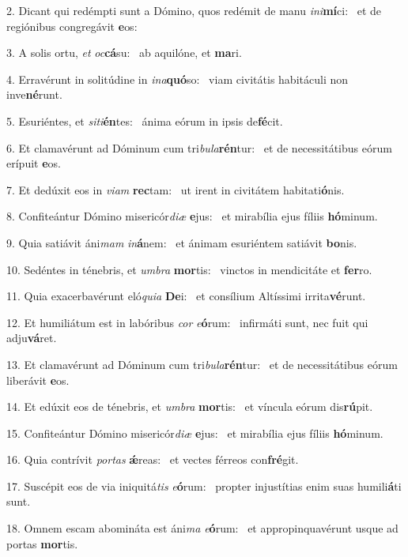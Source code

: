 2. Dicant qui redémpti sunt a Dómino, quos redémit de manu \textit{in}\textit{i}\textbf{mí}ci: \ast\  et de regiónibus congregávit \textbf{e}os:\

3. A solis ortu, \textit{et} \textit{oc}\textbf{cá}su: \ast\  ab aquilóne, et \textbf{ma}ri.\

4. Erravérunt in solitúdine in \textit{in}\textit{a}\textbf{quó}so: \ast\  viam civitátis habitáculi non inve\textbf{né}runt.\

5. Esuriéntes, et \textit{si}\textit{ti}\textbf{én}tes: \ast\  ánima eórum in ipsis de\textbf{fé}cit.\

6. Et clamavérunt ad Dóminum cum tri\textit{bu}\textit{la}\textbf{rén}tur: \ast\  et de necessitátibus eórum erípuit \textbf{e}os.\

7. Et dedúxit eos in \textit{vi}\textit{am} \textbf{rec}tam: \ast\  ut irent in civitátem habitati\textbf{ó}nis.\

8. Confiteántur Dómino misericór\textit{di}\textit{æ} \textbf{e}jus: \ast\  et mirabília ejus fíliis \textbf{hó}minum.\

9. Quia satiávit áni\textit{mam} \textit{in}\textbf{á}nem: \ast\  et ánimam esuriéntem satiávit \textbf{bo}nis.\

10. Sedéntes in ténebris, et \textit{um}\textit{bra} \textbf{mor}tis: \ast\  vinctos in mendicitáte et \textbf{fer}ro.\

11. Quia exacerbavérunt eló\textit{qui}\textit{a} \textbf{De}i: \ast\  et consílium Altíssimi irrita\textbf{vé}runt.\

12. Et humiliátum est in labóribus \textit{cor} \textit{e}\textbf{ó}rum: \ast\  infirmáti sunt, nec fuit qui adju\textbf{vá}ret.\

13. Et clamavérunt ad Dóminum cum tri\textit{bu}\textit{la}\textbf{rén}tur: \ast\  et de necessitátibus eórum liberávit \textbf{e}os.\

14. Et edúxit eos de ténebris, et \textit{um}\textit{bra} \textbf{mor}tis: \ast\  et víncula eórum dis\textbf{rú}pit.\

15. Confiteántur Dómino misericór\textit{di}\textit{æ} \textbf{e}jus: \ast\  et mirabília ejus fíliis \textbf{hó}minum.\

16. Quia contrívit \textit{por}\textit{tas} \textbf{ǽ}reas: \ast\  et vectes férreos con\textbf{fré}git.\

17. Suscépit eos de via iniquitá\textit{tis} \textit{e}\textbf{ó}rum: \ast\  propter injustítias enim suas humili\textbf{á}ti sunt.\

18. Omnem escam abomináta est áni\textit{ma} \textit{e}\textbf{ó}rum: \ast\  et appropinquavérunt usque ad portas \textbf{mor}tis.\

